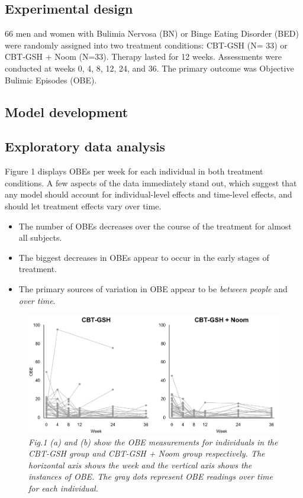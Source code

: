 \documentclass{article}
\begin{document}
\subsection{Experimental design}

66 men and women with Bulimia Nervosa (BN) or Binge Eating Disorder (BED) were randomly assigned into two treatment conditions: CBT-GSH (N= 33) or CBT-GSH + Noom (N=33).  Therapy lasted for 12 weeks.  Assessments were conducted at weeks 0, 4, 8, 12, 24, and 36.  The primary outcome was Objective Bulimic Episodes (OBE).  

\subsection{Model development}
\subsection*{Exploratory data analysis}
Figure 1 displays OBEs per week for each individual in both treatment conditions.  A few aspects of the data immediately stand out, which suggest that any model should account for individual-level effects and time-level effects, and should let treatment effects vary over time.  
\begin{itemize}
\item{The number of OBEs decreases over the course of the treatment for almost all subjects.}
\item{The biggest decreases in OBEs appear to occur in the early stages of treatment.}
\item{The primary sources of variation in OBE appear to be \emph{between people} and \emph{over time}.}
\end{itemize}
%
\begin{figure}[H]
   \begin{center}
\includegraphics[width=\textwidth, height=\textheight, keepaspectratio]{Noom_paths.png}
   \end{center}
\caption{\emph{Fig.1 (a) and (b) show the OBE measurements for individuals in the CBT-GSH group and CBT-GSH + Noom group respectively. The horizontal axis shows the week and the vertical axis shows the instances of OBE. The gray dots represent OBE readings over time for each individual. }}
\end{figure}
\end{document}
